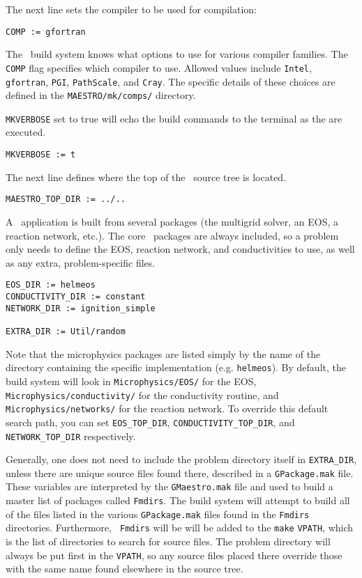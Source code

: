 The next line sets the compiler to be used for compilation:
\begin{lstlisting}[language={[gnu]make},mathescape=false]
  COMP := gfortran
\end{lstlisting}
The \maestro\ build system knows what options to use for various
compiler families.  The {\tt COMP} flag specifies which compiler to
use.  Allowed values include {\tt Intel}, {\tt gfortran}, {\tt PGI},
{\tt PathScale}, and {\tt Cray}.  The specific details of these
choices are defined in the {\tt MAESTRO/mk/comps/} directory.

{\tt MKVERBOSE} set to true will echo the build commands to the
terminal as the are executed.
\begin{lstlisting}[language={[gnu]make},mathescape=false]
  MKVERBOSE := t
\end{lstlisting}

The next line defines where the top of the \maestro\ source tree is located.
\begin{lstlisting}[language={[gnu]make},mathescape=false]
  MAESTRO_TOP_DIR := ../..
\end{lstlisting}

A \maestro\ application is built from several packages (the
multigrid solver, an EOS, a reaction network, etc.).  The core
\maestro\ packages are always included, so a problem only needs
to define the EOS, reaction network, and conductivities to
use, as well as any extra, problem-specific files.  
\begin{lstlisting}[language={[gnu]make},mathescape=false]
EOS_DIR := helmeos   
CONDUCTIVITY_DIR := constant
NETWORK_DIR := ignition_simple

EXTRA_DIR := Util/random
\end{lstlisting}
Note that the microphysics packages are listed simply by the name of 
the directory containing the specific implementation (e.g. {\tt helmeos}).
By default, the build system will look in {\tt Microphysics/EOS/} for
the EOS, {\tt Microphysics/conductivity/} for the conductivity routine,
and {\tt Microphysics/networks/} for the reaction network.  To
override this default search path, you can set {\tt EOS\_TOP\_DIR},
{\tt CONDUCTIVITY\_TOP\_DIR}, and {\tt NETWORK\_TOP\_DIR} respectively.

Generally, one does not need to include the problem directory itself
in {\tt EXTRA\_DIR}, unless there are unique source files found there,
described in a {\tt GPackage.mak} file.  These variables are
interpreted by the {\tt GMaestro.mak} file and used to build a master
list of packages called {\tt Fmdirs}.  The build system will attempt
to build all of the files listed in the various {\tt GPackage.mak}
files found in the {\tt Fmdirs} directories.  Furthermore, {\tt
  Fmdirs} will be will be added to the {\tt make} {\tt VPATH}, which
is the list of directories to search for source files.  The problem
directory will always be put first in the {\tt VPATH}, so any source
files placed there override those with the same name found elsewhere
in the source tree.  

